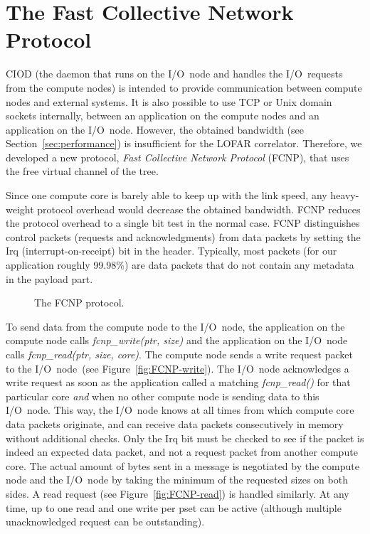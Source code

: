 \documentclass[conference]{worldcomp}
\begin{document}
\section{The Fast Collective Network Protocol}
\label{sec:FCNP}

CIOD (the daemon that runs on the I/O~node and handles the I/O~requests from
the compute nodes) is intended to provide communication between compute nodes
and external systems.
It is also possible to use TCP or Unix domain sockets internally,
between an application on the compute nodes and an application on the I/O~node.
However, the obtained bandwidth (see Section~\ref{sec:performance}) is
insufficient for the LOFAR correlator.
Therefore, we developed a new protocol, \emph{Fast Collective Network
Protocol\/} (FCNP), that uses the free virtual channel of the tree.

Since one compute core is barely able to keep up with the link speed,
any heavy-weight protocol overhead would decrease the obtained bandwidth.
FCNP reduces the protocol overhead to a single bit test in the normal case.
FCNP distinguishes control packets (requests and acknowledgments) from data
packets by setting the Irq (interrupt-on-receipt) bit in the header.
Typically, most packets (for our application roughly 99.98\%) are data packets
that do not contain any metadata in the payload part.

\begin{figure}[h]
\hfill
{}
\caption{The FCNP protocol.}
\label{fig:FCNP-protocol}
\end{figure}

To send data from the compute node to the I/O~node, the application on the
compute node calls \emph{fcnp\_write(ptr, size)\/} and the application on the
I/O~node calls \emph{fcnp\_read(ptr, size, core)}.
The compute node sends a write request packet to the I/O~node~(see
Figure~\ref{fig:FCNP-write}).
The I/O~node acknowledges a write request as soon as the application called a
matching \emph{fcnp\_read()} for that particular core \emph{and\/} when no
other compute node is sending data to this I/O~node.
This way, the I/O~node knows at all times from which compute core data packets
originate, and can receive data packets consecutively in memory without
additional checks.
Only the Irq bit must be checked to see if the packet is indeed an expected
data packet, and not a request packet from another compute core.
The actual amount of bytes sent in a message is negotiated by the compute node
and the I/O~node by taking the minimum of the requested sizes on both sides.
A read request (see Figure~\ref{fig:FCNP-read}) is handled similarly.
At any time, up to one read and one write per pset can be active (although
multiple unacknowledged request can be outstanding).
\end{document}
